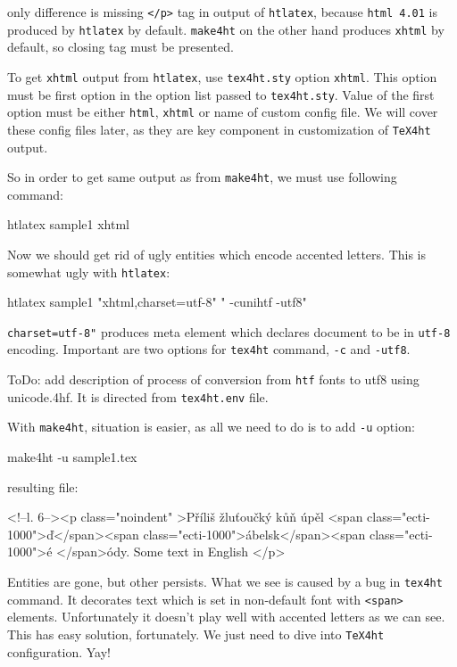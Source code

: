 only difference is missing \texttt{\textless{}/p\textgreater{}} tag in
output of \texttt{htlatex}, because \texttt{html\ 4.01} is produced by
\texttt{htlatex} by default. \texttt{make4ht} on the other hand produces
\texttt{xhtml} by default, so closing tag must be presented.

To get \texttt{xhtml} output from \texttt{htlatex}, use
\texttt{tex4ht.sty} option \texttt{xhtml}. This option must be first
option in the option list passed to \texttt{tex4ht.sty}. Value of the
first option must be either \texttt{html}, \texttt{xhtml} or name of
custom config file. We will cover these config files later, as they are
key component in customization of \texttt{TeX4ht} output.

So in order to get same output as from \texttt{make4ht}, we must use
following command:

\begin{shellcommand}
htlatex sample1 xhtml
\end{shellcommand}

Now we should get rid of ugly entities which encode accented letters.
This is somewhat ugly with \texttt{htlatex}:

\begin{shellcommand}
htlatex sample1 "xhtml,charset=utf-8" " -cunihtf -utf8"
\end{shellcommand}

\texttt{charset=utf-8"} produces meta element which declares document to
be in \texttt{utf-8} encoding. Important are two options for
\texttt{tex4ht} command, \texttt{-c} and \texttt{-utf8}.

ToDo: add description of process of conversion from \texttt{htf} fonts
to utf8 using unicode.4hf. It is directed from \texttt{tex4ht.env} file.

With \texttt{make4ht}, situation is easier, as all we need to do is to
add \texttt{-u} option:

\begin{shellcommand}
make4ht -u sample1.tex
\end{shellcommand}

resulting file:

\begin{htmlsource}
<!--l. 6--><p class="noindent" >Příliš žluťoučký kůň úpěl <span 
class="ecti-1000">ď</span><span 
class="ecti-1000">ábelsk</span><span 
class="ecti-1000">é </span>ódy. Some text in English
</p> 
\end{htmlsource}

Entities are gone, but other persists. What we see is caused by a bug in
\texttt{tex4ht} command. It decorates text which is set in non-default
font with \texttt{\textless{}span\textgreater{}} elements. Unfortunately
it doesn't play well with accented letters as we can see. This has easy
solution, fortunately. We just need to dive into \texttt{TeX4ht}
configuration. Yay!

